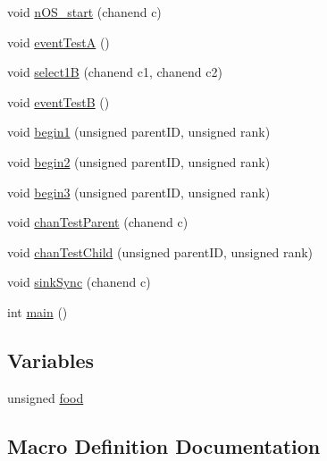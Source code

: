 \begin{DoxyCompactItemize}
\item 
void \hyperlink{_swallow-n_o_s_8xc_a2cd9aef97d45770d39c254b773e83477}{n\+O\+S\+\_\+start} (chanend c)
\item 
void \hyperlink{_swallow-n_o_s_8xc_ac7320b6de82342e3f86191113d769de4}{event\+Test\+A} ()
\item 
void \hyperlink{_swallow-n_o_s_8xc_a2231d4c164203820f4b8cfe713d83825}{select1\+B} (chanend c1, chanend c2)
\item 
void \hyperlink{_swallow-n_o_s_8xc_a0109b01a25654ddc42ced027dbfc9e13}{event\+Test\+B} ()
\item 
void \hyperlink{_swallow-n_o_s_8xc_a1aea871146af548036800eedb26082ed}{begin1} (unsigned parent\+I\+D, unsigned rank)
\item 
void \hyperlink{_swallow-n_o_s_8xc_a1abf6a01d834f9e290ee7456a9c8c207}{begin2} (unsigned parent\+I\+D, unsigned rank)
\item 
void \hyperlink{_swallow-n_o_s_8xc_a12670594797d9ef98eb862adb259f62d}{begin3} (unsigned parent\+I\+D, unsigned rank)
\item 
void \hyperlink{_swallow-n_o_s_8xc_a385eac9a0ad5106c51bd7403df438c0f}{chan\+Test\+Parent} (chanend c)
\item 
void \hyperlink{_swallow-n_o_s_8xc_afd094debaf11a3195abc2c1631180bc5}{chan\+Test\+Child} (unsigned parent\+I\+D, unsigned rank)
\item 
void \hyperlink{_swallow-n_o_s_8xc_af7765801336637df1f7e4ac82af6ba25}{sink\+Sync} (chanend c)
\item 
int \hyperlink{_swallow-n_o_s_8xc_ae66f6b31b5ad750f1fe042a706a4e3d4}{main} ()
\end{DoxyCompactItemize}
\subsection*{Variables}
\begin{DoxyCompactItemize}
\item 
unsigned \hyperlink{_swallow-n_o_s_8xc_a6fe0f40e755f2408ae23015d343c3faa}{food}
\end{DoxyCompactItemize}


\subsection{Macro Definition Documentation}
\hypertarget{_swallow-n_o_s_8xc_a42b7dc8959eae62cab5ef4b4fd010b7d}{}
